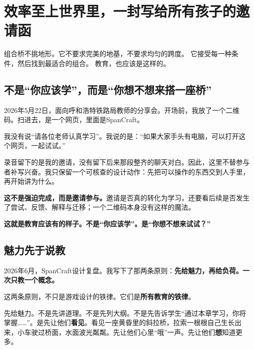 
\chapter{效率至上世界里，一封写给所有孩子的邀请函}

\vspace{0.5cm}

\begin{center}
{\small\color{muted} 组合桥不挑地形。它不要求完美的地基，不要求均匀的跨度。}
{\small\color{muted} 它接受每一种条件，然后找到最适合的组合。}
{\small\color{muted} 教育，也应该是这样的。}
\end{center}

\vspace{1cm}

\section{不是``你应该学''，而是``你想不想来搭一座桥''}

2026年5月22日，面向呼和浩特铁路局教师的分享会。开场前，我放了一个二维码。扫进去，是一个网页，里面是SpanCraft。

我没有说``请各位老师认真学习''。我说的是：``如果大家手头有电脑，可以打开这个网页，一起试试。''

录音留下的是我的邀请，没有留下后来那段整齐的聊天对白。因此，这里不替参与者补写兴奋。我只保留一个可核查的设计动作：先把可以操作的东西交到人手里，再开始讲为什么。

\textbf{这不是强迫完成，而是邀请参与。}邀请是否真的转化为学习，还要看后续是否发生了尝试、反馈、解释与迁移；一个二维码本身没有这样的魔法。

\textbf{这就是教育应该有的样子。不是``你应该学''。是``你想不想来试试？''}

\section{魅力先于说教}

2026年6月，SpanCraft设计复盘。我写下了那两条原则：\textbf{先给魅力，再给负荷。一次只教一个概念。}

这两条原则，不只是游戏设计的铁律。它们是\textbf{所有教育的铁律}。

先给魅力。不是先讲道理。不是先列大纲。不是先告诉学生``通过本章学习，你将掌握\ldots\ldots''。是先让他们\textbf{看见}。看见一座黄昏里的斜拉桥，拉索一根根自己生长出来，小车驶过桥面，水面波光粼粼。先让他们心里``哦''一声。先让他们\textbf{想}知道更多。

